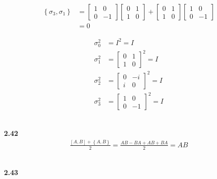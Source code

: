 \documentclass[10pt]{book}
\newcommand{\Textbf}[1]{\hspace{3mm}\\ \textbf{#1}\\}
\begin{document}
	
	
	\begin{equation}
\begin{aligned}
		\left\{\sigma_3, \sigma_1 \right\} &= \begin{bmatrix}
			1 & 0 \\
			0 & -1
		\end{bmatrix}
		\begin{bmatrix}
			0 & 1 \\
			1 & 0
		\end{bmatrix}
		+
		\begin{bmatrix}
			0 & 1 \\
			1 & 0
		\end{bmatrix}
		\begin{bmatrix}
			1 & 0 \\
			0 & -1
		\end{bmatrix}\\
		&=0
	\end{aligned}
\end{equation}
	
	\begin{equation}
\begin{aligned}
		\sigma_0^2 &= I^2 = I\\
		\sigma_1^2 &= \begin{bmatrix}
			0 & 1 \\
			1 & 0
		\end{bmatrix} ^2 = I\\
		\sigma_2^2 &= \begin{bmatrix}
			0 & -i \\
			i & 0
		\end{bmatrix} ^2 = I\\
		\sigma_3^2 &= \begin{bmatrix}
			1 & 0 \\
			0 & -1
		\end{bmatrix} ^2 = I
	\end{aligned}
\end{equation}
	
	
	
	\Textbf{2.42}
	\begin{equation}
\begin{aligned}
		\frac{\left[A, B \right] + \left\{A, B\right\}}{2} = \frac{AB - BA + AB + BA}{2} = AB
	\end{aligned}
\end{equation}
	
	
	
	\Textbf{2.43}
	
\end{document}
